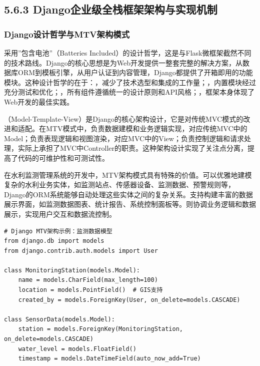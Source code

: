 \hypertarget{djangoux4f01ux4e1aux7ea7ux5168ux6808ux6846ux67b6ux67b6ux6784ux4e0eux5b9eux73b0ux673aux5236}{%
\subsection{5.6.3 Django企业级全栈框架架构与实现机制}\label{djangoux4f01ux4e1aux7ea7ux5168ux6808ux6846ux67b6ux67b6ux6784ux4e0eux5b9eux73b0ux673aux5236}}

\hypertarget{djangoux8bbeux8ba1ux54f2ux5b66ux4e0emtvux67b6ux6784ux6a21ux5f0f}{%
\subsubsection{Django设计哲学与MTV架构模式}\label{djangoux8bbeux8ba1ux54f2ux5b66ux4e0emtvux67b6ux6784ux6a21ux5f0f}}

采用''包含电池''（Batteries Included）的设计哲学，这是与Flask微框架截然不同的技术路线。Django的核心思想是为Web开发提供一整套完整的解决方案，从数据库ORM到模板引擎，从用户认证到内容管理，Django都提供了开箱即用的功能模块。这种设计哲学的在于：，减少了技术选型和集成的工作量；，内置模块经过充分测试和优化；，所有组件遵循统一的设计原则和API风格；，框架本身体现了Web开发的最佳实践。

（Model-Template-View）是Django的核心架构设计，它是对传统MVC模式的改进和适配。在MTV模式中，负责数据建模和业务逻辑实现，对应传统MVC中的Model；负责表现逻辑和视图渲染，对应MVC中的View；负责控制逻辑和请求处理，实际上承担了MVC中Controller的职责。这种架构设计实现了关注点分离，提高了代码的可维护性和可测试性。

在水利监测管理系统的开发中，MTV架构模式具有特殊的价值。可以优雅地建模复杂的水利业务实体，如监测站点、传感器设备、监测数据、预警规则等，Django的ORM系统能够自动处理这些实体之间的复杂关系。支持构建丰富的数据展示界面，如监测数据图表、统计报告、系统控制面板等。则协调业务逻辑和数据展示，实现用户交互和数据流控制。

\begin{lstlisting}[style=python]
# Django MTV架构示例：监测数据模型
from django.db import models
from django.contrib.auth.models import User

class MonitoringStation(models.Model):
    name = models.CharField(max_length=100)
    location = models.PointField()  # GIS支持
    created_by = models.ForeignKey(User, on_delete=models.CASCADE)
    
class SensorData(models.Model):
    station = models.ForeignKey(MonitoringStation, on_delete=models.CASCADE)
    water_level = models.FloatField()
    timestamp = models.DateTimeField(auto_now_add=True)
\end{lstlisting}

